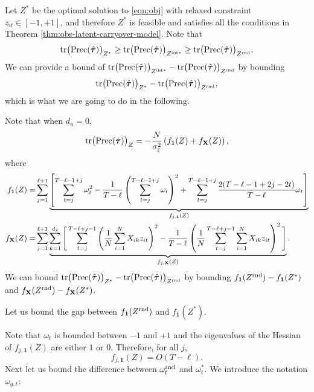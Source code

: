 		
				Let $Z^\ast$ be the optimal solution to \eqref{eqn:obj} with relaxed constraint $z_{it} \in [-1,+1]$, and therefore $Z^\ast$ is feasible and satisfies all the conditions in Theorem \ref{thm:obs-latent-carryover-model}. Note that 
				\[ \mathrm{tr} \big(\mathrm{Prec}(\hat{\bm{\tau}})  \big)_{Z^\ast}  \geq \mathrm{tr} \big(\mathrm{Prec}(\hat{\bm{\tau}})  \big)_{Z^{\mathrm{int}\ast}} \geq \mathrm{tr} \big(\mathrm{Prec}(\hat{\bm{\tau}})  \big)_{Z^{\textnormal{rnd}}}. \]
				We can provide a bound of $\mathrm{tr} \big(\mathrm{Prec}(\hat{\bm{\tau}})  \big)_{Z^{\mathrm{int}\ast}} - \mathrm{tr} \big(\mathrm{Prec}(\hat{\bm{\tau}})  \big)_{Z^{\textnormal{rnd}}}$ by bounding 
				\[ \mathrm{tr} \big(\mathrm{Prec}(\hat{\bm{\tau}})  \big)_{Z^\ast}  - \mathrm{tr} \big(\mathrm{Prec}(\hat{\bm{\tau}})  \big)_{Z^{\textnormal{rnd}}},\]
				which is what we are going to do in the following.
				
				Note that when $d_u = 0$, 
				\[\mathrm{tr} \big(\mathrm{Prec}(\hat{\bm{\tau}})  \big)_{Z}  = - \frac{N}{\sigma_{\varepsilon}^2} \left(f_{\bm{1}}(Z) + f_{\mathbf{X}}(Z) \right), \]
				where 
				\begin{align*}
				 f_{\bm{1}}(Z)   =&   \sum_{j = 1}^{\ell+1} \underbrace{\left[ \sum_{t = j}^{T - \ell-1+j} \omega_t^2  - \frac{1}{T - \ell} \left(  \sum_{t=j}^{T - \ell-1+j} \omega_t  \right)^2 +  \sum_{t = j}^{T - \ell-1+j} \frac{2(T - \ell-1+2j-2t)}{T - \ell}  \omega_t   \right]}_{f_{j,\bm{1}}(Z)}  \\
		     f_{\mathbf{X}}(Z) =&    \sum_{j = 1}^{\ell+1} \underbrace{\sum_{k=1}^{d_x} \Bigg[  \sum_{t=j}^{T - \ell+j-1} \left(\frac{1}{N} \sum_{i = 1}^N X_{ik} z_{it} \right)^2  - \frac{1}{T - \ell}  \left( \frac{1}{N} \sum_{t=j}^{T - \ell+j-1} \sum_{i = 1}^N X_{ik} z_{it}  \right)^2  \Bigg]}_{f_{j,\mathbf{X}}(Z)}.
				\end{align*}
				We can bound $\mathrm{tr} \big(\mathrm{Prec}(\hat{\bm{\tau}})  \big)_{Z^\ast}  - \mathrm{tr} \big(\mathrm{Prec}(\hat{\bm{\tau}})  \big)_{Z^{\textnormal{rnd}}}$ by bounding $f_{\bm{1}}(Z^{\textnormal{rnd}}) - f_{\bm{1}}(Z^\ast)$
				and $f_{\mathbf{X}}(Z^{\textnormal{rnd}}) - f_{\mathbf{X}}(Z^\ast)$.
				
				
				Let us bound the gap between $f_{\bm{1}}(Z^{\textnormal{rnd}})$ and $f_{\bm{1}}(Z^\ast)$. 
				
				
				Note that $\omega_t$ is bounded between $-1$ and $+1$ and the eigenvalues of the Hessian of $f_{j,\bm{1}}(Z) $ are either $1$ or $0$. Therefore, for all $j$,
				\[f_{j,\bm{1}}(Z) = O(T - \ell ). \]
				Next let us bound the difference between $\omega_t^{\textnormal{rnd}}$ and $\omega^\ast_t$. We introduce the notation $\omega_{g,t}$:
				

